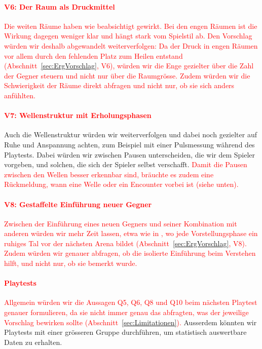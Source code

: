 \documentclass[../Main.tex]{subfiles}
\begin{document}
\paragraph{\textcolor{red}{V6: Der Raum als Druckmittel}}
\textcolor{red}{Die weiten Räume haben wie beabsichtigt gewirkt. Bei den engen Räumen ist die Wirkung dagegen weniger klar und hängt stark vom Spielstil ab. Den Vorschlag würden wir deshalb abgewandelt weiterverfolgen: Da der Druck in engen Räumen vor allem durch den fehlenden Platz zum Heilen entstand (Abschnitt~\ref{sec:ErgVorschlag}, V6), würden wir die Enge gezielter über die Zahl der Gegner steuern und nicht nur über die Raumgrösse. Zudem würden wir die Schwierigkeit der Räume direkt abfragen und nicht nur, ob sie sich anders anfühlten.}

\paragraph{\textcolor{red}{V7: Wellenstruktur mit Erholungsphasen}}
Auch die Wellenstruktur würden wir weiterverfolgen und dabei noch gezielter auf Ruhe und Anspannung achten, zum Beispiel mit einer Pulsmessung während des Playtests.\autocite[285--287]{drachen2018gamesuserresearch} Dabei würden wir zwischen Pausen unterscheiden, die wir dem Spieler vorgeben, und solchen, die sich der Spieler selbst verschafft. \textcolor{red}{Damit die Pausen zwischen den Wellen besser erkennbar sind, bräuchte es zudem eine Rückmeldung, wann eine Welle oder ein Encounter vorbei ist (siehe unten).}

\paragraph{\textcolor{red}{V8: Gestaffelte Einführung neuer Gegner}}
\textcolor{red}{Zwischen der Einführung eines neuen Gegners und seiner Kombination mit anderen würden wir mehr Zeit lassen, etwa wie in , wo jede Vorstellungsphase ein ruhiges Tal vor der nächsten Arena bildet (Abschnitt~\ref{sec:ErgVorschlag}, V8). Zudem würden wir genauer abfragen, ob die isolierte Einführung beim Verstehen hilft, und nicht nur, ob sie bemerkt wurde.}

\paragraph{\textcolor{red}{Playtests}}
\textcolor{red}{Allgemein würden wir die Aussagen Q5, Q6, Q8 und Q10 beim nächsten Playtest genauer formulieren, da sie nicht immer genau das abfragten, was der jeweilige Vorschlag bewirken sollte (Abschnitt~\ref{sec:Limitationen}).} Ausserdem könnten wir Playtests mit einer grösseren Gruppe durchführen, um statistisch auswertbare Daten zu erhalten.
\end{document}
